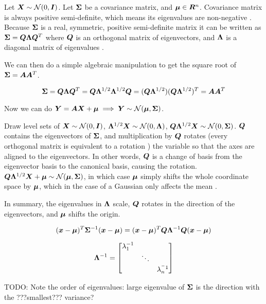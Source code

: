 \begin{tcolorbox}
    Let ${\bm{X}} \sim {\mathcal{N}}(0, {\bm{I}})$. Let ${\bm{\Sigma}}$ be a covariance matrix, and ${\bm{\mu}} \in {\bm{R}}^n$. Covariance matrix is always positive semi-definite, which means its eigenvalues are non-negative . Because ${\bm{\Sigma}}$ is a real, symmetric, positive semi-definite matrix it can be written as ${\bm{\Sigma}} = {\bm{Q}} {\bm{\Lambda}} {\bm{Q}}^T$ where ${\bm{Q}}$ is an orthogonal matrix of eigenvectors, and ${\bm{\Lambda}}$ is a diagonal matrix of eigenvalues .
    
    We can then do a simple algebraic manipulation to get the square root of ${\bm{\Sigma}} = {\bm{A}} {\bm{A}}^T$. 
    
    \begin{equation}
        {\bm{\Sigma}} = {\bm{Q}} {\bm{\Lambda}} {\bm{Q}}^T = {\bm{Q}} {\bm{\Lambda}}^{1/2} {\bm{\Lambda}}^{1/2} {\bm{Q}} = ({\bm{Q}} {\bm{\Lambda}}^{1/2}) ({\bm{Q}} {\bm{\Lambda}}^{1/2})^T = {\bm{A}} {\bm{A}}^T
    \end{equation}
    
    Now we can do ${\bm{Y}} = {\bm{A}} {\bm{X}} + {\bm{\mu}} \implies {\bm{Y}} \sim {\mathcal{N}}({\bm{\mu}}, {\bm{\Sigma}})$.
    
    Draw level sets of ${\bm{X}} \sim {\mathcal{N}}(0, {\bm{I}})$, ${\bm{\Lambda}}^{1/2} {\bm{X}} \sim {\mathcal{N}}(0, {\bm{\Lambda}})$, ${\bm{Q}} {\bm{\Lambda}}^{1/2} {\bm{X}} \sim {\mathcal{N}}(0, {\bm{\Sigma}})$. ${\bm{Q}}$ contains the eigenvectors of ${\bm{\Sigma}}$, and multiplication by ${\bm{Q}}$ rotates (every orthogonal matrix is equivalent to a rotation ) the variable so that the axes are aligned to the eigenvectors. In other words, ${\bm{Q}}$ is a change of basis from the eigenvector basis to the canonical basis, causing the rotation. ${\bm{Q}} {\bm{\Lambda}}^{1/2} {\bm{X}} + {\bm{\mu}} \sim {\mathcal{N}}({\bm{\mu}}, {\bm{\Sigma}})$, in which case ${\bm{\mu}}$ simply shifts the whole coordinate space by ${\bm{\mu}}$, which in the case of a Gaussian only affects the mean .
    
    In summary, the eigenvalues in ${\bm{\Lambda}}$ scale, ${\bm{Q}}$ rotates in the direction of the eigenvectors, and ${\bm{\mu}}$ shifts the origin.
    
    \begin{equation}
        ({\bm{x}} - {\bm{\mu}})^T {\bm{\Sigma}}^{-1} ({\bm{x}} - {\bm{\mu}}) = ({\bm{x}} - {\bm{\mu}})^T {\bm{Q}} {\bm{\Lambda}}^{-1} {\bm{Q}} ({\bm{x}} - {\bm{\mu}})
    \end{equation}
    
    \begin{equation}
        {\bm{\Lambda}}^{-1} = \begin{bmatrix}
            \lambda_1^{-1} & & \\
            & \ddots & \\
            & & \lambda_n^{^-1}
        \end{bmatrix}
    \end{equation}
    
    TODO: Note the order of eigenvalues: large eigenvalue of ${\bm{\Sigma}}$ is the direction with the ???smallest??? variance?
\end{tcolorbox}


